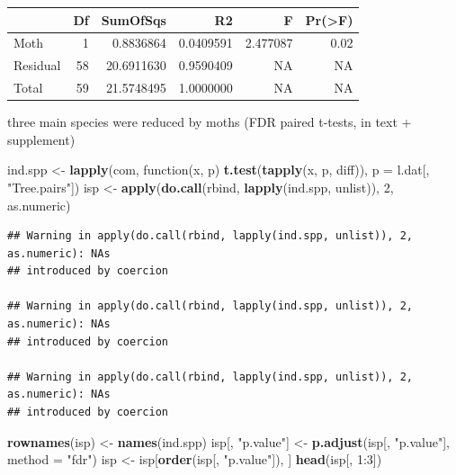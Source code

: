 \documentclass[]{article}
\newenvironment{Shaded}{\begin{snugshade}}{\end{snugshade}}
\newcommand{\KeywordTok}[1]{\textcolor[rgb]{0.13,0.29,0.53}{\textbf{{#1}}}}
\newcommand{\DataTypeTok}[1]{\textcolor[rgb]{0.13,0.29,0.53}{{#1}}}
\newcommand{\DecValTok}[1]{\textcolor[rgb]{0.00,0.00,0.81}{{#1}}}
\newcommand{\StringTok}[1]{\textcolor[rgb]{0.31,0.60,0.02}{{#1}}}
\newcommand{\NormalTok}[1]{{#1}}
\begin{document}
\begin{tabular}{l|r|r|r|r|r}
\hline
  & Df & SumOfSqs & R2 & F & Pr(>F)\\
\hline
Moth & 1 & 0.8836864 & 0.0409591 & 2.477087 & 0.02\\
\hline
Residual & 58 & 20.6911630 & 0.9590409 & NA & NA\\
\hline
Total & 59 & 21.5748495 & 1.0000000 & NA & NA\\
\hline
\end{tabular}

three main species were reduced by moths (FDR paired t-tests, in text +
supplement)

\begin{Shaded}
\begin{Highlighting}[]
\NormalTok{ind.spp <-}\StringTok{ }\KeywordTok{lapply}\NormalTok{(com, function(x, p) }\KeywordTok{t.test}\NormalTok{(}\KeywordTok{tapply}\NormalTok{(x, p, diff)), }\DataTypeTok{p =} \NormalTok{l.dat[, }\StringTok{"Tree.pairs"}\NormalTok{])}
\NormalTok{isp <-}\StringTok{ }\KeywordTok{apply}\NormalTok{(}\KeywordTok{do.call}\NormalTok{(rbind, }\KeywordTok{lapply}\NormalTok{(ind.spp, unlist)), }\DecValTok{2}\NormalTok{, as.numeric)}
\end{Highlighting}
\end{Shaded}

\begin{verbatim}
## Warning in apply(do.call(rbind, lapply(ind.spp, unlist)), 2, as.numeric): NAs
## introduced by coercion

## Warning in apply(do.call(rbind, lapply(ind.spp, unlist)), 2, as.numeric): NAs
## introduced by coercion

## Warning in apply(do.call(rbind, lapply(ind.spp, unlist)), 2, as.numeric): NAs
## introduced by coercion
\end{verbatim}

\begin{Shaded}
\begin{Highlighting}[]
\KeywordTok{rownames}\NormalTok{(isp) <-}\StringTok{ }\KeywordTok{names}\NormalTok{(ind.spp)}
\NormalTok{isp[, }\StringTok{"p.value"}\NormalTok{] <-}\StringTok{ }\KeywordTok{p.adjust}\NormalTok{(isp[, }\StringTok{"p.value"}\NormalTok{], }\DataTypeTok{method =} \StringTok{"fdr"}\NormalTok{)}
\NormalTok{isp <-}\StringTok{ }\NormalTok{isp[}\KeywordTok{order}\NormalTok{(isp[, }\StringTok{"p.value"}\NormalTok{]), ]}
\KeywordTok{head}\NormalTok{(isp[, }\DecValTok{1}\NormalTok{:}\DecValTok{3}\NormalTok{])}
\end{Highlighting}
\end{Shaded}
\end{document}
